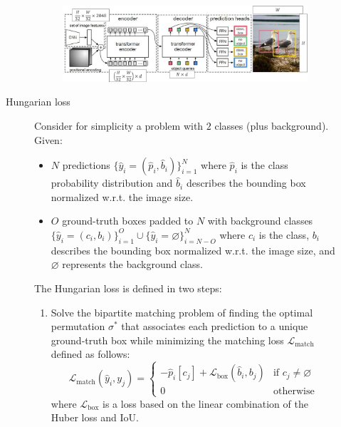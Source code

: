 \begin{description}
\begin{description}
                \begin{figure}[H]
                    \centering
                    \includegraphics[width=0.75\linewidth]{./img/_detr_architecture.jpg}
                \end{figure}

            \item[Hungarian loss] 
                Consider for simplicity a problem with $2$ classes (plus background). Given:
                \begin{itemize}
                    \item $N$ predictions $\{ \hat{y}_i = (\hat{p}_i, \hat{b}_i) \}_{i=1}^N$ where $\hat{p}_i$ is the class probability distribution and $\hat{b}_i$ describes the bounding box normalized w.r.t. the image size.
                    \item $O$ ground-truth boxes padded to $N$ with background classes $\{ \hat{y}_i = (c_i, b_i) \}_{i=1}^O \cup \{ \hat{y}_i = \varnothing \}_{i=N - O}^{N}$ where $c_i$ is the class, $b_i$ describes the bounding box normalized w.r.t. the image size, and $\varnothing$ represents the background class.
                \end{itemize}

                The Hungarian loss is defined in two steps:
                \begin{enumerate}
                    \item Solve the bipartite matching problem of finding the optimal permutation $\sigma^*$ that associates each prediction to a unique ground-truth box while minimizing the matching loss $\mathcal{L}_\text{match}$ defined as follows:
                    \[ 
                        \mathcal{L}_\text{match}(\hat{y}_i, y_j) = \begin{cases}
                            -\hat{p}_i[c_j] + \mathcal{L}_\text{box}(\hat{b}_i, b_j) & \text{if $c_j \neq \varnothing$} \\
                            0 & \text{otherwise}
                        \end{cases} 
                    \]
                    where $\mathcal{L}_\text{box}$ is a loss based on the linear combination of the Huber loss and IoU.


\end{enumerate}
\end{description}
\end{description}
